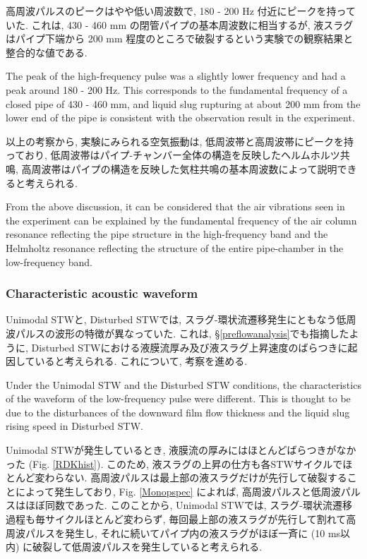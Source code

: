 \documentclass[12pt]{article}
\begin{document}
高周波パルスのピークはやや低い周波数で, 180 - 200 Hz 付近にピークを持っていた. 
これは, 430 - 460 mm の閉管パイプの基本周波数に相当するが, 液スラグはパイプ下端から 200 mm 程度のところで破裂するという実験での観察結果と整合的な値である. 

The peak of the high-frequency pulse was a slightly lower frequency and had a peak around 180 - 200 Hz.
This corresponds to the fundamental frequency of a closed pipe of 430 - 460 mm, and liquid slug rupturing at about 200 mm from the lower end of the pipe is consistent with the observation result in the experiment.

以上の考察から, 実験にみられる空気振動は, 低周波帯と高周波帯にピークを持っており, 低周波帯はパイプ-チャンバー全体の構造を反映したヘルムホルツ共鳴, 高周波帯はパイプの構造を反映した気柱共鳴の基本周波数によって説明できると考えられる.

From the above discussion, it can be considered that the air vibrations seen in the experiment can be explained by the fundamental frequency of the air column resonance reflecting the pipe structure in the high-frequency band and the Helmholtz resonance reflecting the structure of the entire pipe-chamber in the low-frequency band.

\subsubsection{Characteristic acoustic waveform}
Unimodal STWと, Disturbed STWでは, スラグ-環状流遷移発生にともなう低周波パルスの波形の特徴が異なっていた. 
これは, \S \ref{preflowanalysis}でも指摘したように, Disturbed STWにおける液膜流厚み及び液スラグ上昇速度のばらつきに起因していると考えられる. これについて, 考察を進める.

Under the Unimodal STW and the Disturbed STW conditions, the characteristics of the waveform of the low-frequency pulse were different.
This is thought to be due to the disturbances of the downward film flow thickness and the liquid slug rising speed in Disturbed STW.

Unimodal STWが発生しているとき, 液膜流の厚みにはほとんどばらつきがなかった (Fig. \ref{RDKhist}). 
このため, 液スラグの上昇の仕方も各STWサイクルでほとんど変わらない. 
高周波パルスは最上部の液スラグだけが先行して破裂することによって発生しており, Fig. \ref{Monopspec} によれば, 高周波パルスと低周波パルスはほぼ同数であった. 
このことから, Unimodal STWでは, スラグ-環状流遷移過程も毎サイクルほとんど変わらず, 毎回最上部の液スラグが先行して割れて高周波パルスを発生し, それに続いてパイプ内の液スラグがほぼ一斉に (10 ms以内) に破裂して低周波パルスを発生していると考えられる.
\end{document}
